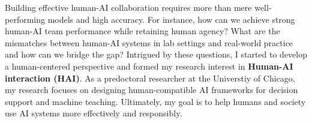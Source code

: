 




Building effective human-AI collaboration requires more than mere well-performing models and high accuracy. For instance, how can we achieve strong human-AI team performance while retaining human agency? What are the mismatches between human-AI systems in lab settings and real-world practice and how can we bridge the gap?
Intrigued by these questions, I started to develop a human-centered perspective and formed my research interest in \textbf{Human-AI interaction (HAI)}. 
As a predoctoral researcher at the Universtiy of Chicago, my research focuses on designing human-compatible AI frameworks for decision support and machine teaching. 
Ultimately, my goal is to help humans and society use AI systems more effectively and responsibly. 






